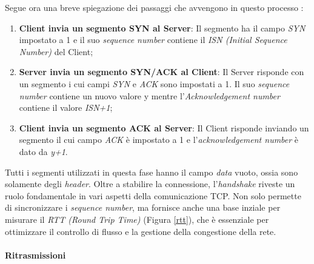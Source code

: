 \noindent Segue ora una breve spiegazione dei passaggi che avvengono in questo processo : 

\begin{enumerate}
    \item \textbf{Client invia un segmento SYN al Server}: Il segmento ha il campo \emph{SYN} impostato a 1 e il suo \emph{sequence number} contiene il \emph{ISN (Initial Sequence Number)} del Client;
    \item \textbf{Server invia un segmento SYN/ACK al Client}: Il Server risponde con un segmento i cui campi \emph{SYN} e \emph{ACK} sono impostati a 1. Il suo \emph{sequence number} contiene un nuovo valore y mentre l'\emph{Acknowledgement number} contiene il valore \emph{ISN+1};
    \item \textbf{Client invia un segmento ACK al Server}: Il Client risponde inviando un segmento il cui campo \emph{ACK} è impostato a 1 e l'\emph{acknowledgement number} è dato da \emph{y+1}.
\end{enumerate}

\noindent Tutti i segmenti utilizzati in questa fase hanno il campo \emph{data} vuoto, ossia sono solamente degli \emph{header}. 
Oltre a stabilire la connessione, l'\emph{handshake} riveste un ruolo fondamentale in vari aspetti della comunicazione TCP.
Non solo permette di sincronizzare i \emph{sequence number}, ma fornisce anche una base inziale per misurare il \emph{RTT (Round Trip Time)} \glsfirstoccur (Figura \ref{rtt}), che è essenziale per ottimizzare il controllo di flusso e la gestione della congestione della rete.

\paragraph{ Ritrasmissioni }

